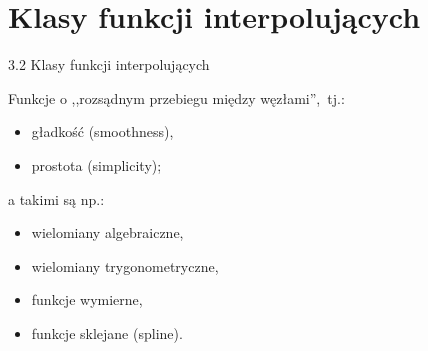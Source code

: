\section{Klasy funkcji interpolujących}
	\begin{frame}{3.2 Klasy funkcji interpolujących}

	

	Funkcje o ,,rozsądnym przebiegu między węzłami'',\ tj.:

	\setlength\parindent{24pt} 
\begin{itemize}
    \item gładkość (smoothness),
    
    \item prostota (simplicity);
\end{itemize}
	\noindent a takimi są np.:
\begin{itemize}
	\item wielomiany algebraiczne,

	\item wielomiany trygonometryczne,

	\item funkcje wymierne,

	\item funkcje sklejane (spline).
\end{itemize}
    \end{frame}

